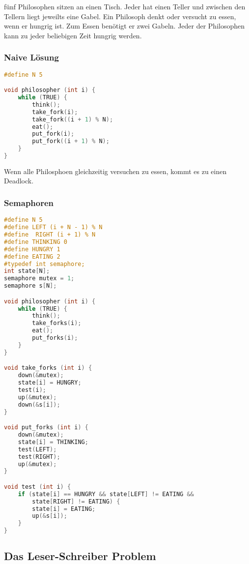 fünf Philosophen sitzen an einen Tisch. Jeder hat einen Teller und zwischen den
Tellern liegt jeweilts eine Gabel. Ein Philosoph denkt oder versucht zu essen,
wenn er hungrig ist. Zum Essen benötigt er zwei Gabeln. Jeder der Philosophen
kann zu jeder beliebigen Zeit hungrig werden.

\subsubsection{Naive Lösung}

\begin{lstlisting}[language=C]
#define N 5

void philosopher (int i) {
    while (TRUE) {
        think();
        take_fork(i);
        take_fork((i + 1) % N);
        eat();
        put_fork(i);
        put_fork((i + 1) % N);
    }
} 
\end{lstlisting}

Wenn alle Philosphoen gleichzeitig versuchen zu essen, kommt es zu einen
Deadlock.

\subsubsection{Semaphoren}

\begin{lstlisting}[language=C]
#define N 5
#define LEFT (i + N - 1) % N
#define  RIGHT (i + 1) % N
#define THINKING 0
#define HUNGRY 1
#define EATING 2
#typedef int semaphore;
int state[N];
semaphore mutex = 1;
semaphore s[N];

void philosopher (int i) {
    while (TRUE) {
        think();
        take_forks(i);
        eat();
        put_forks(i);
    }
} 

void take_forks (int i) {
    down(&mutex);
    state[i] = HUNGRY;
    test(i);
    up(&mutex);
    down(&s[i]);
} 

void put_forks (int i) {
    down(&mutex);
    state[i] = THINKING;
    test(LEFT);
    test(RIGHT);
    up(&mutex);
} 

void test (int i) {
    if (state[i] == HUNGRY && state[LEFT] != EATING &&
        state[RIGHT] != EATING) {
        state[i] = EATING;
        up(&s[i]);
    }
} 
\end{lstlisting}

\subsection{Das Leser-Schreiber Problem}

